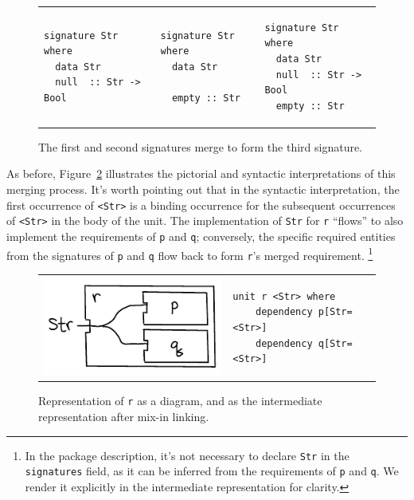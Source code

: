 \begin{figure}
\begin{tabular}{p{} p{} p{}}
\begin{lstlisting}
signature Str where
  data Str
  null  :: Str -> Bool
\end{lstlisting}
&
\begin{lstlisting}
signature Str where
  data Str

  empty :: Str
\end{lstlisting}
&
\begin{lstlisting}
signature Str where
  data Str
  null  :: Str -> Bool
  empty :: Str
\end{lstlisting}
\end{tabular}
\caption{The first and second signatures merge to form the third signature.}
\label{fig:signature-merging}
\end{figure}

As before, Figure~\ref{fig:signature-merging-interp} illustrates the
pictorial and syntactic interpretations of this merging process.  It's
worth pointing out that in the syntactic interpretation, the first
occurrence of \verb|<Str>| is a binding occurrence for the subsequent
occurrences of \verb|<Str>| in the body of the unit.  The implementation
of \verb|Str| for \verb|r| ``flows'' to also implement the requirements
of \verb|p| and \verb|q|; conversely, the specific required entities
from the signatures of \verb|p| and \verb|q| flow back to form \verb|r|'s
merged requirement.%
%
\footnote{In the package description, it's not necessary to declare \texttt{Str}
in the \texttt{signatures} field, as it can be inferred from the requirements
of \texttt{p} and \texttt{q}.  We render it explicitly in the intermediate
representation for clarity.}

\begin{figure}
\begin{tabular}{p{} p{}}
\center\includegraphics{figures/p-q-merge-Str.pdf}
&
\vspace{2em}
\begin{lstlisting}
unit r <Str> where
    dependency p[Str=<Str>]
    dependency q[Str=<Str>]
\end{lstlisting}
\end{tabular}
\caption{Representation of \texttt{r} as a diagram, and as the intermediate
representation after mix-in linking.}
\label{fig:signature-merging-interp}
\end{figure}

